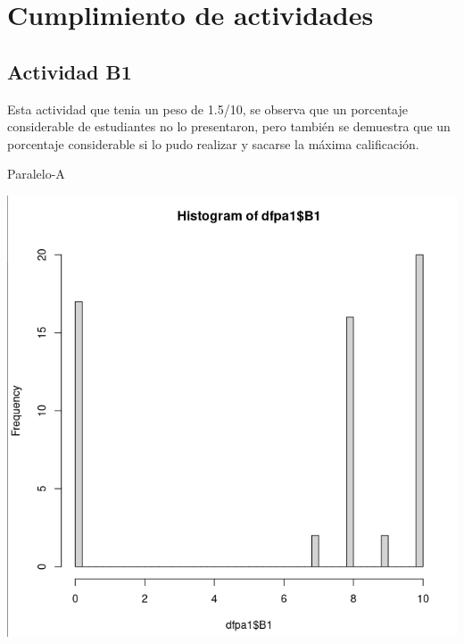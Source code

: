\documentclass[a4pa<per,12pt,spanish]{article}
\begin{document}
\section{Cumplimiento de actividades}
\label{sec:cuml-de-activv}

\subsection{Actividad B1}
\label{sec:acctiviidad-b1}
Esta actividad que tenia un peso de 1.5/10, se observa que un porcentaje considerable de estudiantes no lo presentaron, pero también se demuestra que un porcentaje considerable si lo pudo realizar y sacarse la máxima calificación.\\


\begin{minipage}[h]{0.45\linewidth}
Paralelo-A

\includegraphics[scale=0.3]{images/histoB1.png}
\end{minipage}
\end{document}
